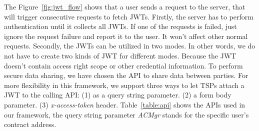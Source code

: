 The Figure~\ref{fig:jwt_flow} shows that a user sends a request to the server, that will trigger consecutive requests to fetch JWTs. Firstly, the server has to perform authentication until it collects all JWTs. If one of the requests is failed, just ignore the request failure and report it to the user. It won't affect other normal requests. Secondly, the JWTs can be utilized in two modes. In other words, we do not have to create two kinds of JWT for different modes. Because the JWT doesn't contain access right scope or other credential information. To perform secure data sharing, we have chosen the API to share data between parties. For more flexibility in this framework, we support three ways to let TSPs attach a JWT to the calling API: (1) as a query string parameter. (2) a form body parameter. (3) \textit{x-access-token} header. Table~\ref{table:api} shows the APIs used in our framework, the query string parameter \textit{ACMgr} stands for the specific user's contract address.
